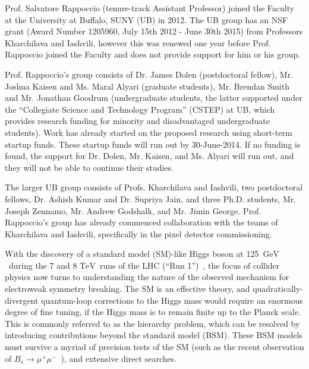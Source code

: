 \documentclass[12pt]{proposalnsf}
\newcommand{\TeV}{\ensuremath{\mathrm{TeV}}}
\newcommand{\GeVcc}{\ensuremath{\mathrm{GeV}}}
\begin{document}
Prof. Salvatore Rappoccio (tenure-track Assistant Professor) joined
the Faculty at the University at Buffalo, SUNY (UB) in 2012. The UB
group has an NSF grant (Award Number 1205960, July 15th 2012 - June
30th 2015) from Professors Kharchilava and Iashvili, however this was
renewed one year before Prof. Rappoccio joined the Faculty and does
not provide support for him or his group. 



Prof. Rappoccio's group consists
of Dr. James Dolen (postdoctoral fellow), Mr. Joshua Kaisen and Ms. Maral Alyari
(graduate students), Mr. Brendan Smith and Mr. Jonathan Goodrum (undergraduate
students, the latter supported under the ``Collegiate Science and
Technology Program'' (CSTEP)
at UB, which provides research funding for minority and
disadvantaged undergraduate students). Work has already started
on the proposed research using short-term startup funds. 
These startup funds will run out by 30-June-2014. If no funding is
found, the support for Dr. Dolen, Mr. Kaisen, and Ms. Alyari will run
out, and they will not be able to continue their studies. 

The larger UB group consists of Profs. Kharchilava and Iashvili, two
postdoctoral fellows, Dr. Ashish Kumar and Dr. Supriya Jain, and three
Ph.D. students, Mr. Joseph Zennamo, Mr. Andrew Godshalk, and Mr. Jimin
George. Prof. Rappoccio's group has already commenced collaboration
with the teams of Kharchilava and Iashvili, specifically in the pixel
detector commissioning. 



With the discovery of a 
standard model (SM)-like Higgs boson at
125~\GeVcc\ during the 7 and 8 \TeV\ runs of the LHC 
(``Run 1'')~\cite{higgs_atlas,higgs_cms}, 
the focus of collider physics now turns to understanding the nature of
the observed mechanism for electroweak symmetry breaking.
The SM is an effective theory, and quadratically-divergent
quantum-loop corrections to the Higgs
mass would require an enormous degree of fine tuning, if the Higgs
mass is to remain finite up to the Planck scale. This is commonly
referred to as the hierarchy problem, which can be resolved by
introducing contributions beyond the standard model (BSM). 
These BSM models must survive a myriad of precision tests of the SM
(such as the recent observation of $B_s\rightarrow
\mu^+\mu^-$~\cite{bsmumu_cms,bsmumu_lhcb}), and extensive direct
searches. 
\end{document}

